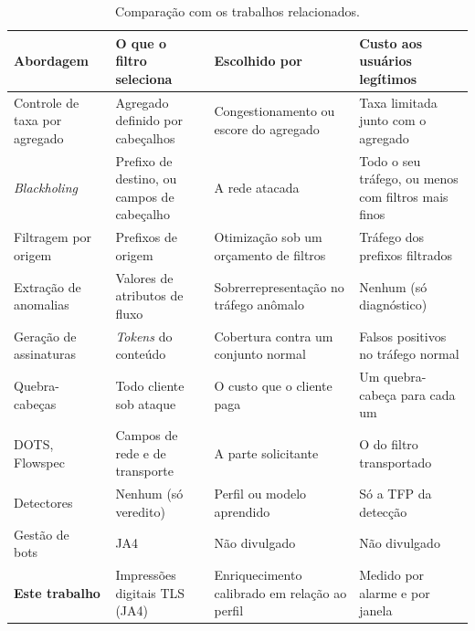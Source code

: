 \documentclass[conference,letterpaper,10pt]{IEEEtran}
\newcommand\1{\textit{(i)}}
\newcommand\2{\textit{(ii)}}
\newcommand\3{\textit{(iii)}}
\begin{document}
\begin{table}[t]
\centering
\caption{Comparação com os trabalhos relacionados.}
\label{tab:related}
\footnotesize
\setlength{\tabcolsep}{4pt}
\begin{tabular}{@{}l>{\raggedright\arraybackslash}p{3.6cm}>{\raggedright\arraybackslash}p{3.8cm}>{\raggedright\arraybackslash}p{3.8cm}@{}}
\toprule
\textbf{Abordagem} & \textbf{O que o filtro seleciona} & \textbf{Escolhido por} & \textbf{Custo aos usuários legítimos} \\
\midrule
Controle de taxa por agregado~\cite{mahajan2002pushback,alcoz2022accturbo} & Agregado definido por cabeçalhos & Congestionamento ou escore do agregado & Taxa limitada junto com o agregado \\
\textit{Blackholing}~\cite{dietzel2018stellar} & Prefixo de destino, ou campos de cabeçalho & A rede atacada & Todo o seu tráfego, ou menos com filtros mais finos \\
Filtragem por origem~\cite{soldo2012filtering} & Prefixos de origem & Otimização sob um orçamento de filtros & Tráfego dos prefixos filtrados \\
Extração de anomalias~\cite{silveira2010urca,brauckhoff2009extraction} & Valores de atributos de fluxo & Sobrerrepresentação no tráfego anômalo & Nenhum (só diagnóstico) \\
Geração de assinaturas~\cite{li2006hamsa} & \textit{Tokens} do conteúdo & Cobertura contra um conjunto normal & Falsos positivos no tráfego normal \\
Quebra-cabeças~\cite{kandula2005botz} & Todo cliente sob ataque & O custo que o cliente paga & Um quebra-cabeça para cada um \\
DOTS, Flowspec~\cite{dots2020data,rfc8955flowspec} & Campos de rede e de transporte & A parte solicitante & O do filtro transportado \\
Detectores~\cite{bharathi2012pca,kemp2023approach,belcastro2025klage} & Nenhum (só veredito) & Perfil ou modelo aprendido & Só a TFP da detecção \\
Gestão de bots~\cite{martinetti2024ja4signals} & JA4 & Não divulgado & Não divulgado \\
\textbf{Este trabalho} & Impressões digitais TLS (JA4) & Enriquecimento calibrado em relação ao perfil & Medido por alarme e por janela \\
\bottomrule
\end{tabular}
\end{table}

\end{document}
